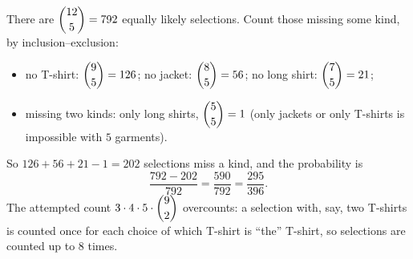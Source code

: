 There are $\dbinom{12}{5}=792$ equally likely selections. Count those missing some kind, by inclusion--exclusion:
\begin{itemize}
\item no T-shirt: $\dbinom95=126$; no jacket: $\dbinom85=56$; no long shirt: $\dbinom75=21$;
\item missing two kinds: only long shirts, $\dbinom55=1$ (only jackets or only T-shirts is impossible with $5$ garments).
\end{itemize}
So $126+56+21-1=202$ selections miss a kind, and the probability is
\[\dfrac{792-202}{792}=\dfrac{590}{792}=\boxed{\dfrac{295}{396}}.\]
The attempted count $3\cdot4\cdot5\cdot\dbinom92$ overcounts: a selection with, say, two T-shirts is counted once for each choice of which T-shirt is ``the'' T-shirt, so selections are counted up to $8$ times.

